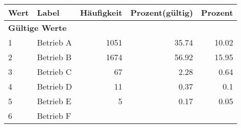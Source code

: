      \begin{longtable}{lXrrr}
     \toprule
     \textbf{Wert} & \textbf{Label} & \textbf{Häufigkeit} & \textbf{Prozent(gültig)} & \textbf{Prozent} \\
     \endhead
     \midrule
     \multicolumn{5}{l}{\textbf{Gültige Werte}}\\

     1 &
     \multicolumn{1}{X}{ Betrieb A   } &


       \num{1051} &
       \num[round-mode=places,round-precision=2]{35.74} &
         \num[round-mode=places,round-precision=2]{10.02} \\

     2 &
     \multicolumn{1}{X}{ Betrieb B   } &


       \num{1674} &
       \num[round-mode=places,round-precision=2]{56.92} &
         \num[round-mode=places,round-precision=2]{15.95} \\

     3 &
     \multicolumn{1}{X}{ Betrieb C   } &


       \num{67} &
       \num[round-mode=places,round-precision=2]{2.28} &
         \num[round-mode=places,round-precision=2]{0.64} \\

     4 &
     \multicolumn{1}{X}{ Betrieb D   } &


       \num{11} &
       \num[round-mode=places,round-precision=2]{0.37} &
         \num[round-mode=places,round-precision=2]{0.1} \\

     5 &
     \multicolumn{1}{X}{ Betrieb E   } &


       \num{5} &
       \num[round-mode=places,round-precision=2]{0.17} &
         \num[round-mode=places,round-precision=2]{0.05} \\

     6 &
     \multicolumn{1}{X}{ Betrieb F   } &



\end{longtable}
